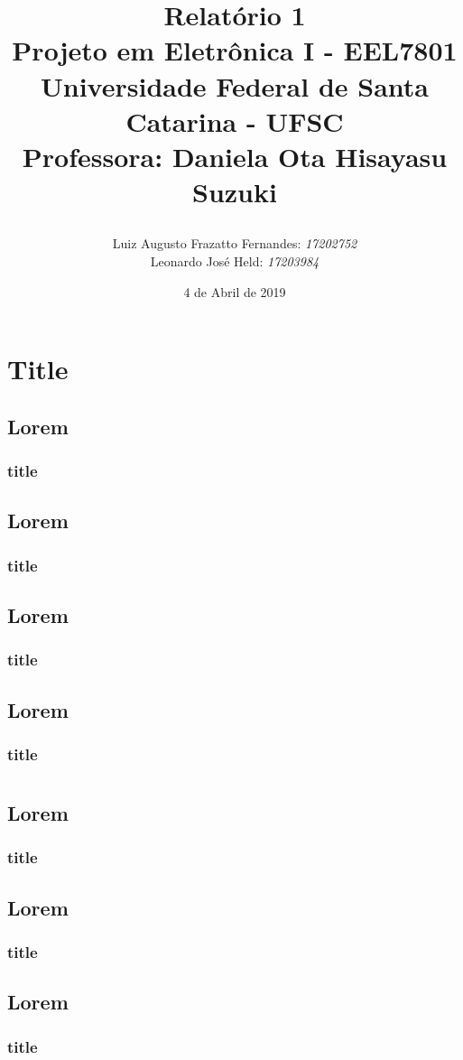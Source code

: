 \documentclass[11pt,a4paper]{report}
\title{Relatório 1  \\
	Projeto em Eletrônica I - EEL7801 \\ \vfill
	\normalsize{Universidade Federal de Santa Catarina - UFSC \\
		Professora: Daniela Ota Hisayasu Suzuki}
	\author{
		{Luiz Augusto Frazatto Fernandes: \it{17202752}} \\
		{Leonardo José Held: \it{17203984}}
}
}
\date{4 de Abril de 2019}
\begin{document}
	\maketitle
	\setcounter{chapter}{0}
\chapter{Title}
	\section{Lorem}
	\subsection{title}

		\section{Lorem}
	\subsection{title}
	
		\section{Lorem}
	\subsection{title}
	
		\section{Lorem}
	\subsection{title}
	
		\setcounter{chapter}{1}
	\chapter{}
	
		\section{Lorem}
	\subsection{title}
	
		\section{Lorem}
	\subsection{title}
	
		\section{Lorem}
	\subsection{title}
	
	
\end{document}
